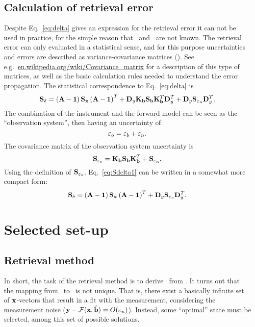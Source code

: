 \subsection{Calculation of retrieval error}
%
Despite Eq.~\ref{eq:delta} gives an expression for the retrieval error it can
not be used in practice, for the simple reason that \SttVct\ and \FrwMdlVct\
are not known. The retrieval error can only evaluated in a statistical sense,
and for this purpose uncertainties and errors are described as
variance-covariance matrices (\CvrMtr). See e.g.\
\url{en.wikipedia.org/wiki/Covariance_matrix} for a description of this type of
matrices, as well as the basic calculation rules needed to understand the error
propagation. The statistical correspondence to Eq.~\ref{eq:delta} is
\begin{equation}
  \label{eq:Sdelta1}
  \mathbf{S}_{\delta} = \left(\mathbf{A}-\mathbf{1}\right)\mathbf{S}_{\mathbf{x}}
  \left(\mathbf{A}-\mathbf{1}\right)^T + 
  \mathbf{D}_{y}\mathbf{K}_{\mathbf{b}}\mathbf{S}_{\mathbf{b}}
  \mathbf{K}_{\mathbf{b}}^T\mathbf{D}_{y}^T + 
  \mathbf{D}_{y}\mathbf{S}_{\varepsilon_n}\mathbf{D}_{y}^T.
\end{equation}
The combination of the instrument and the forward model can be seen as
the ``observation system'', then having an uncertainty of
\begin{equation}
  \label{eq:eps_o}
  \varepsilon_o = \varepsilon_b + \varepsilon_n. 
\end{equation}
The covariance matrix of the observation system uncertainty is 
\begin{equation}
  \label{eq:So}
  \mathbf{S}_{\varepsilon_o} = \mathbf{K}_{\mathbf{b}}\mathbf{S}_{\mathbf{b}}
  \mathbf{K}_{\mathbf{b}}^T + \mathbf{S}_{\varepsilon_n}.
\end{equation}
Using the definition of $\mathbf{S}_{\varepsilon_o}$, Eq.~\ref{eq:Sdelta1}
can be written in a somewhat more compact form:
\begin{equation}
  \label{eq:Sdelta2}
  \mathbf{S}_{\delta} = \left(\mathbf{A}-\mathbf{1}\right)\mathbf{S}_{\mathbf{x}}
  \left(\mathbf{A}-\mathbf{1}\right)^T + \mathbf{D}_{y}\mathbf{S}_{\varepsilon_o}\mathbf{D}_{y}^T.
\end{equation}




\section{Selected set-up}
\label{sec:setup}

\subsection{Retrieval method}
\label{sec:setup:inverse}
%
In short, the task of the retrieval method is to derive \RtrVct\ from \MsrVct.
It turns out that the mapping from \MsrVct\ to \RtrVct\ is not unique. That is,
there exist a basically infinite set of $\mathbf{x}$-vectors that result in a fit
with the measurement, considering the measurement noise
($\mathbf{y}-\mathcal{F}(\mathbf{x},\hat{\mathbf{b}})=O(\varepsilon_n)$\todo{Is this correct
  nomenclature?}). Instead, some ``optimal'' state must be selected, among this
set of possible solutions.

